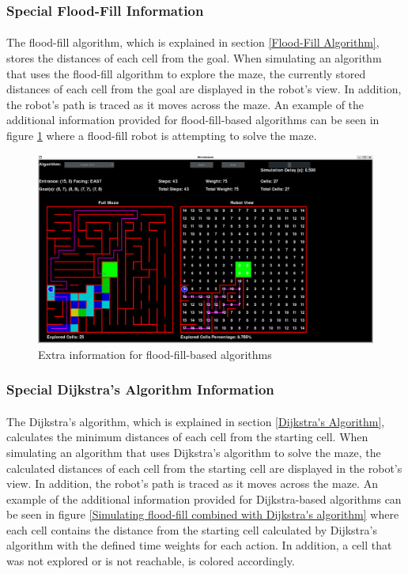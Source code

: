 \documentclass[12pt]{article}
\begin{document}
\subsubsection{Special Flood-Fill Information}
\paragraph{}
The flood-fill algorithm, which is explained in section \ref{Flood-Fill Algorithm}, stores the distances of each \gls{cell} from the goal.
When simulating an algorithm that uses the flood-fill algorithm to explore the \gls{maze}, the currently stored distances of each \gls{cell} from the goal are displayed in the robot's view.
In addition, the robot's path is traced as it moves across the \gls{maze}.
An example of the additional information provided for flood-fill-based algorithms can be seen in figure \ref{Extra information for flood-fill-based algorithms} where a flood-fill robot is attempting to solve the \gls{maze}.

\begin{figure}[H]
\centering
\includegraphics[width=\textwidth]{images/simulation_flood_fill.png}
\caption{Extra information for flood-fill-based algorithms}
\label{Extra information for flood-fill-based algorithms}
\end{figure}

\subsubsection{Special Dijkstra's Algorithm Information}
\paragraph{}
The Dijkstra's algorithm, which is explained in section \ref{Dijkstra's Algorithm}, calculates the minimum distances of each \gls{cell} from the starting \gls{cell}.
When simulating an algorithm that uses Dijkstra's algorithm to solve the \gls{maze}, the calculated distances of each \gls{cell} from the starting \gls{cell} are displayed in the robot's view.
In addition, the robot's path is traced as it moves across the \gls{maze}.
An example of the additional information provided for Dijkstra-based algorithms can be seen in figure \ref{Simulating flood-fill combined with Dijkstra's algorithm} where each \gls{cell} contains the distance from the starting \gls{cell} calculated by Dijkstra's algorithm with the defined time weights for each action.
In addition, a \gls{cell} that was not explored or is not reachable, is colored accordingly.
\end{document}
